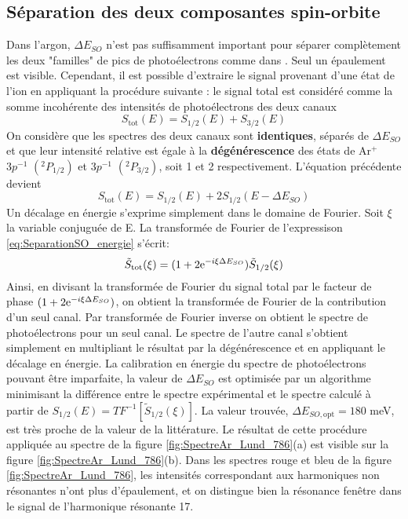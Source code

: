 \subsection{Séparation des deux composantes spin-orbite}
\label{subsec:SeparationSO}
Dans l'argon, $\Delta E_{SO}$ n'est pas suffisamment important pour séparer complètement les deux "familles" de pics de photoélectrons comme dans . Seul un épaulement est visible. Cependant, il est possible d'extraire le signal provenant d'une état de l'ion en appliquant la procédure suivante : le signal total est considéré comme la somme incohérente des intensités de photoélectrons des deux canaux
\begin{equation}
S_{\text{tot}} (E) = S_{1/2}(E) + S_{3/2}(E)
\end{equation} 
On considère que les spectres des deux canaux sont \textbf{identiques}, séparés de $\Delta E_{SO}$ et que leur intensité relative est égale à la \textbf{dégénérescence} des états de Ar$^+$ $3p^{-1}$ $(^{2}P_{1/2})$ et $3p^{-1}$ $(^{2}P_{3/2})$, soit 1 et 2 respectivement. L'équation précédente devient
\begin{equation}
S_{\text{tot}} (E) = S_{1/2}(E) + 2 S_{1/2}(E - \Delta E_{SO})
\label{eq:SeparationSO_energie}
\end{equation}
Un décalage en énergie s'exprime simplement dans le domaine de Fourier. Soit $\xi$ la variable conjuguée de E. La transformée de Fourier de l'expressison \ref{eq:SeparationSO_energie} s'écrit:
\begin{equation}
\tilde{S}_{\text{tot}}(\xi) = (1 + 2 \mathrm{e}^{-i\xi \Delta E_{SO}} ) \tilde{S}_{1/2}(\xi)
\end{equation}
Ainsi, en divisant la transformée de Fourier du signal total par le facteur de phase $(1 + 2 \mathrm{e}^{-i\xi \Delta E_{SO}})$, on obtient la transformée de Fourier de la contribution d'un seul canal. Par transformée de Fourier inverse on obtient le spectre de photoélectrons pour un seul canal. Le spectre de l'autre canal s'obtient simplement en multipliant le résultat par la dégénérescence et en appliquant le décalage en énergie. La calibration en énergie du spectre de photoélectrons pouvant être imparfaite, la valeur de $ \Delta E_{SO}$ est optimisée par un algorithme minimisant la différence entre le spectre expérimental et le spectre calculé à partir de $S_{1/2}(E) = TF^{-1}[\tilde{S}_{1/2}(\xi)]$. La valeur trouvée, $\Delta E_{SO,\text{opt}} = 180$ meV, est très proche de la valeur de la littérature. Le résultat de cette procédure appliquée au spectre de la figure \ref{fig:SpectreAr_Lund_786}(a) est visible sur la figure \ref{fig:SpectreAr_Lund_786}(b). Dans les spectres rouge et bleu de la figure \ref{fig:SpectreAr_Lund_786}, les intensités correspondant aux harmoniques non résonantes n'ont plus d'épaulement, et on distingue bien la résonance fenêtre dans le signal de l'harmonique résonante 17.

